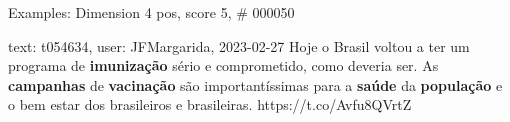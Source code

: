 \begin{frame}{Examples: Dimension 4 pos, score 5, \# 000050}
\footnotesize
\begin{exampleblock}{text: t054634, user: JFMargarida, 2023-02-27}
Hoje o Brasil voltou a ter um programa de \textbf{imunização} sério e 
comprometido, como deveria ser. As \textbf{campanhas} de \textbf{vacinação} são 
importantíssimas para a \textbf{saúde} da \textbf{população} e o bem estar dos 
brasileiros e brasileiras. https://t.co/Avfu8QVrtZ 
\end{exampleblock}
\end{frame}
